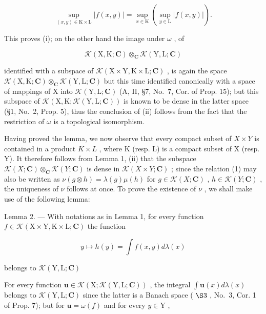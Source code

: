 \[
\sup _ {(x, y) \in \mathrm{K} \times \mathrm{L}} | f (x, y) | = \sup _ {x \in \mathrm{K}} \left(\sup _ {y \in \mathrm{L}} | f (x, y) |\right).
\]

This proves (i); on the other hand the image under \(\omega\) , of

\[
\mathcal {K} (\mathrm{X}, \mathrm{K}; \mathbf {C}) \otimes_ {\mathbf {C}} \mathcal {K} (\mathrm{Y}, \mathrm{L}; \mathbf {C})
\]

identified with a subspace of \(\mathcal{K}(\mathrm{X}\times \mathrm{Y},\mathrm{K}\times \mathrm{L};\mathbf{C})\) , is again the space \(\mathcal{K}(\mathrm{X},\mathrm{K};\mathbf{C})\otimes_{\mathbf{C}}\mathcal{K}(\mathrm{Y},\mathrm{L};\mathbf{C})\) but this time identified canonically with a space of mappings of X into \(\mathcal{K}(\mathrm{Y},\mathrm{L};\mathbf{C})\) (A, II, §7, No.~7, Cor. of Prop. 15); but this subspace of \(\mathcal{K}(\mathrm{X},\mathrm{K};\mathcal{K}(\mathrm{Y},\mathrm{L};\mathbf{C}))\) is known to be dense in the latter space (§1, No.~2, Prop. 5), thus the conclusion of (ii) follows from the fact that the restriction of \(\omega\) is a topological isomorphism.

Having proved the lemma, we now observe that every compact subset of \(X \times Y\) is contained in a product \(K \times L\) , where K (resp. L) is a compact subset of X (resp. Y). It therefore follows from Lemma 1, (ii) that the subspace \(\mathcal{K}(X; \mathbf{C}) \otimes_{\mathbf{C}} \mathcal{K}(Y; \mathbf{C})\) is dense in \(\mathcal{K}(X \times Y; \mathbf{C})\) ; since the relation (1) may also be written as \(\nu(g \otimes h) = \lambda(g)\mu(h)\) for \(g \in \mathcal{K}(X; \mathbf{C})\) , \(h \in \mathcal{K}(Y; \mathbf{C})\) , the uniqueness of \(\nu\) follows at once. To prove the existence of \(\nu\) , we shall make use of the following lemma:

Lemma 2. --- With notations as in Lemma 1, for every function \(f \in \mathcal{K}(\mathrm{X} \times \mathrm{Y}, \mathrm{K} \times \mathrm{L}; \mathbf{C})\) the function

\[
y \mapsto h (y) = \int f (x, y) d \lambda (x)\tag{2}
\]

belongs to \(\mathcal{K}(\mathrm{Y},\mathrm{L};\mathbf{C})\)

For every function \(\mathbf{u} \in \mathcal{K}(\mathrm{X};\mathcal{K}(\mathrm{Y},\mathrm{L};\mathbf{C}))\) , the integral \(\int \mathbf{u}(x)d\lambda (x)\) belongs to \(\mathcal{K}(\mathrm{Y},\mathrm{L};\mathbf{C})\) since the latter is a Banach space ( \(\S 3\) , No.~3, Cor. 1 of Prop. 7); but for \(\mathbf{u} = \omega(f)\) and for every \(y \in \mathrm{Y}\) ,

